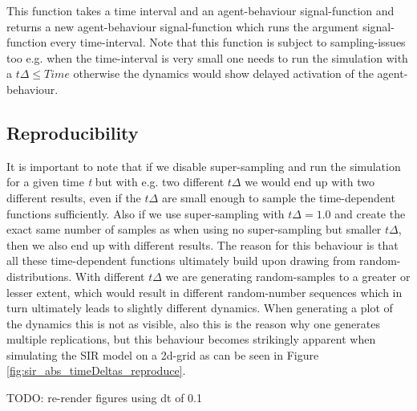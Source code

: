 This function takes a time interval and an agent-behaviour signal-function and returns a new agent-behaviour signal-function which runs the argument signal-function every time-interval. Note that this function is subject to sampling-issues too e.g. when the time-interval is very small one needs to run the simulation with a $t\Delta \leq Time$ otherwise the dynamics would show delayed activation of the agent-behaviour.

\subsection{Reproducibility}
It is important to note that if we disable super-sampling and run the simulation for a given time \textit{t} but with e.g. two different $t\Delta$ we would end up with two different results, even if the $t\Delta$ are small enough to sample the time-dependent functions sufficiently. Also if we use super-sampling with $t\Delta = 1.0$ and create the exact same number of samples as when using no super-sampling but smaller $t\Delta$, then we also end up with different results.
The reason for this behaviour is that all these time-dependent functions ultimately build upon drawing from random-distributions. With different $t\Delta$ we are generating random-samples to a greater or lesser extent, which would result in different random-number sequences which in turn ultimately leads to slightly different dynamics. When generating a plot of the dynamics this is not as visible, also this is the reason why one generates multiple replications, but this behaviour becomes strikingly apparent when simulating the SIR model on a 2d-grid as can be seen in Figure \ref{fig:sir_abs_timeDeltas_reproduce}.

TODO: re-render figures using dt of 0.1

